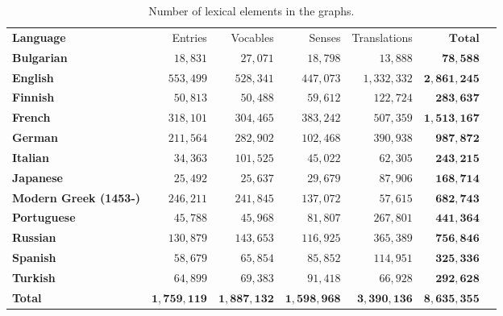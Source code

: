 \documentclass[10pt, a4paper]{article}
\begin{document}
\begin{table}[hbt]
\begin{minipage}{\linewidth}
\begin{center}
\begin{small}
\begin{tabular}{lrrrrrr}
\hline
\textbf{Language} & Entries & Vocables & Senses & Translations & $\mathbf{Total}$ \\
\textbf{Bulgarian} & $18,831$ & $27,071$ & $18,798$ & $13,888$ & $\mathbf{78,588}$ \\
\textbf{English} & $553,499$ & $528,341$ & $447,073$ & $1,332,332$ & $\mathbf{2,861,245}$ \\
\textbf{Finnish} & $50,813$ & $50,488$ & $59,612$ & $122,724$ & $\mathbf{283,637}$ \\
\textbf{French} & $318,101$ & $304,465$ & $383,242$ & $507,359$ & $\mathbf{1,513,167}$ \\
\textbf{German} & $211,564$ & $282,902$ & $102,468$ & $390,938$ & $\mathbf{987,872}$ \\
\textbf{Italian} & $34,363$ & $101,525$ & $45,022$ & $62,305$ & $\mathbf{243,215}$ \\
\textbf{Japanese} & $25,492$ & $25,637$ & $29,679$ & $87,906$ & $\mathbf{168,714}$ \\
\textbf{Modern Greek (1453-)} & $246,211$ & $241,845$ & $137,072$ & $57,615$ & $\mathbf{682,743}$ \\
\textbf{Portuguese} & $45,788$ & $45,968$ & $81,807$ & $267,801$ & $\mathbf{441,364}$ \\
\textbf{Russian} & $130,879$ & $143,653$ & $116,925$ & $365,389$ & $\mathbf{756,846}$ \\
\textbf{Spanish} & $58,679$ & $65,854$ & $85,852$ & $114,951$ & $\mathbf{325,336}$ \\
\textbf{Turkish} & $64,899$ & $69,383$ & $91,418$ & $66,928$ & $\mathbf{292,628}$ \\
\textbf{Total} & $\mathbf{1,759,119}$ & $\mathbf{1,887,132}$ & $\mathbf{1,598,968}$ & $\mathbf{3,390,136}$ & $\mathbf{8,635,355}$ \\
\end{tabular}
\end{small}
\end{center}
\end{minipage}
\caption{Number of lexical elements in the graphs.}
\label{table:size}
\end{table}
\end{document}

